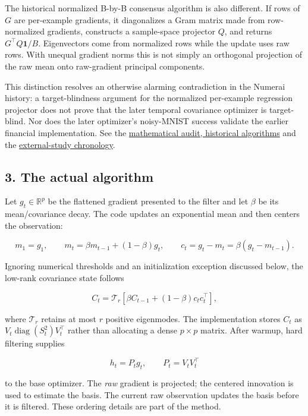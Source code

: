 \documentclass[
  british,
  10pt,
  a4paper,
]{article}
\begin{document}
The historical normalized B-by-B consensus algorithm is also different.
If rows of \(G\) are per-\allowbreak{}example gradients, it diagonalizes
a Gram matrix made from row-\allowbreak{}normalized gradients,
constructs a sample-\allowbreak{}space projector \(Q\), and returns
\(G^\top Q\mathbf{1}/B\). Eigenvectors come from normalized rows while
the update uses raw rows. With unequal gradient norms this is not simply
an orthogonal projection of the raw mean onto raw-\allowbreak{}gradient
principal components.\allowbreak{}

This distinction resolves an otherwise alarming contradiction in the
Numerai history: a target-\allowbreak{}blindness argument for the
normalized per-\allowbreak{}example regression projector does not prove
that the later temporal covariance optimizer is
target-\allowbreak{}blind.\allowbreak{} Nor does the later optimizer's
noisy-\allowbreak{}MNIST success validate the earlier financial
implementati\allowbreak{}on.\allowbreak{} See the
\hyperref[mathematical-audit]{mathematical audit, historical algorithms}
and the \hyperref[external-studies]{external-\allowbreak{}study
chronology}.

\subsection{3. The actual
algorithm}\label{synthesis--the-actual-algorithm}

Let \(g_t\in\mathbb{R}^p\) be the flattened gradient presented to the
filter and let \(\beta\) be its mean/\allowbreak{}covariance decay. The
code updates an exponential mean and then centers the observation:

\[
m_1=g_1,\qquad
m_t=\beta m_{t-1}+(1-\beta)g_t,\qquad
c_t=g_t-m_t=\beta(g_t-m_{t-1}).
\]

Ignoring numerical thresholds and an initialization exception discussed
below, the low-rank covariance state follows

\[
C_t=\mathcal{T}_r\!\left[
\beta C_{t-1}+(1-\beta)c_tc_t^\top
\right],
\]

where \(\mathcal{T}_r\) retains at most \(r\) positive
eigenmodes.\allowbreak{} The implementation stores \(C_t\) as
\(V_t\operatorname{diag}(S_t^2)V_t^\top\) rather than allocating a dense
\(p\times p\) matrix. After warmup, hard filtering supplies

\[
h_t=P_tg_t,\qquad P_t=V_tV_t^\top
\]

to the base optimizer. The \emph{raw} gradient is projected; the
centered innovation is used to estimate the basis. The current raw
observation updates the basis before it is filtered. These ordering
details are part of the method.
\end{document}
